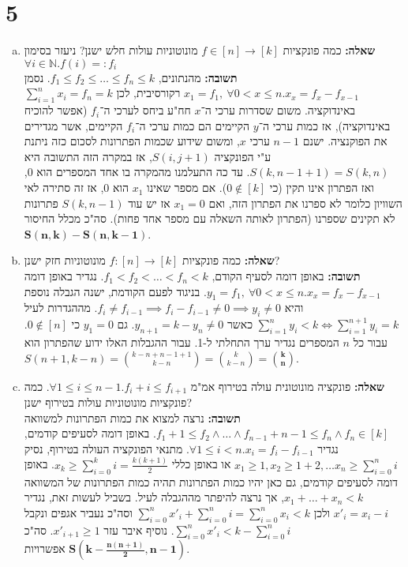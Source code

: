 \documentclass[]{article}
\newcommand\N     {\mathbb{N}}
\newcommand\sumni {\sum_{i = 0}^{n}}
\begin{document}
	\section*{5} %
	\begin{enumerate}[(a)]
		\item \textbf{שאלה: }כמה פונקציות $f \in [n] \to [k]$ מונוטוניות עולות חלש ישנן? ניעזר בסימון $\forall i \in \N. f(i) =: f_i$ \\
		\textbf{תשובה: }מהנתונים, $f_1 \le f_2 \le \dots \le f_n \le k$. נסמן $x_1 = f_1, \ \forall 0 < x \le n. x_x = f_x - f_{x - 1} $ רקורסיבית, לכן $\sum_{i = 1}^{n}x_i = f_n = k$ באינדוקציה. משום שסדרות ערכי ה־$x$ חח"ע ביחס לערכי ה־$f_i$ (אפשר להוכיח באינדוקציה), אז כמות ערכי ה־$y$ הקיימים הם כמות ערכי ה־$f_i$ הקיימים, אשר מגדירים את הפוקנציה. ישנם $n - 1$ ערכי $x$, ומשום שידוע שכמות הפתרונות לסכום כזה ניתנת ע"י הפונקציה $S(i, j + 1)$, אז במקרה הזה התשובה היא $S(k, n - 1 + 1) = S(k, n)$. עד כה התעלמנו מהמקרה בו אחד המספרים הוא $0$, ואז הפתרון אינו תקין (כי $0 \notin [k]$). אם מספר שאינו $x_1$ הוא $0$, אז זה סתירה לאי השוויון כלומר לא ספרנו את הפתרון הזה, ואם $x_1 = 0$ אז יש עוד $S(k, n - 1)$ פתרונות לא תקינים שספרנו (הפתרון לאותה השאלה עם מספר אחד פחות). סה"כ מכלל החיסור $\bm{S(n, k) - S(n, k - 1)}$. 
		\item \textbf{שאלה: }כמה פונקציות $f \colon [n] \to [k]$ מונוטוניות חזק ישנן? \\
		\textbf{תשובה: }באופן דומה לסעיף הקודם, $f_1 < f_2 < \dots < f_n < k$. נגדיר באופן דומה $y_1 = f_1, \ \forall 0 < x \le n. x_x = f_x - f_{x - 1}$. בניגוד לפעם הקודמת, ישנה הגבלה נוספת והיא $f_i \neq f_{i - 1} \implies f_i - f_{i - 1} \neq 0 \implies y_i \neq 0$. מההגדרות לעיל $\sum_{i = 1}^{n}y_i < k \iff \sum_{i = 1}^{n + 1}y_i = k $ כאשר $y_{n + 1} = k - y_n \neq 0$. גם $y_1 = 0$ כי $0 \notin [n]$. עבור כל $n$ המספרים נגדיר ערך התחלתי ל-1. עבור ההגבלות האלו ידוע שהפתרון הוא $S(n + 1, k - n) = \binom{k - n + n - 1 + 1}{k - n} = \binom{k}{k - n} = \bm{\binom{k}{n}}$. 
		\item \textbf{שאלה: }פונקציה מונוטונית עולה בטירוף אמ"מ $\forall 1 \le i \le n - 1. f_i + i \le f_{i + 1}$. כמה פונקציות מונוטוניות עולות בטירוף ישנן? \\
		\textbf{תשובה: }נרצה למצוא את כמות הפתרונות למשוואה $f_1 + 1 \le f_2 \land \dots \land f_{n - 1} + n - 1 \le f_n \land f_n \in [k]$. באופן דומה לסעיפים קודמים, נגדיר $\forall 1 \le i < n. x_i = f_i - f_{i - 1}$. מתנאי הפונקציה העולה בטירוף, נסיק $x_1 \ge 1, x_2 \ge 1 + 2, \dots x_n \ge \sumni i$ או באופן כללי $x_k \ge \sum_{i = 0}^{k} i = \frac{k(k + 1)}{2}$. באופן דומה לסעיפים קודמים, גם כאן יהיו כמות הפתרונות תהיה כמות הפתרונות של המשוואה $x_1 + \dots + x_n < k$, אך נרצה להיפתר מההגבלה לעיל. בשביל לעשות זאת, נגדיר $x'_i = x_i - i$ ולכן $\sumni x'_i + \sumni i = \sumni x_i < k$ וסה"כ נעביר אגפים ונקבל $\sumni x'_i < k - \sumni i$. נוסיף איבר עזר $x'_{i + 1} \ge 1$. סה"כ $\bm{S(k - \frac{n(n + 1)}{2}, n - 1)}$ אפשרויות. 

\end{enumerate}
\end{document}
